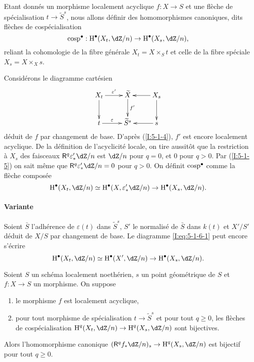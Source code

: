 \subsubsection{}\label{I:5-1-6}

Etant donnés un morphisme localement acyclique $f:X\to S$ et une flèche de 
spécialisation $t\to \widetilde S^s$, nous allons définir des 
homomorphismes canoniques, dits flèches de cospécialisation 
\[
  \cosp^\bullet : \h^\bullet(X_t,\dZ/n) \to \h^\bullet(X_s,\dZ/n)\text{,}
\]
reliant la cohomologie de la fibre générale $X_t=X\times_S t$ et celle de la 
fibre spéciale $X_s=X\times_X s$. 

Considérons le diagramme cartésien 
\[\xymatrix{
  X_t \ar[d] \ar[r]^-{\varepsilon'} 
    & \widetilde X \ar[d]^-{f'} 
    & \ar[l] X_s \ar[d] \\
  t \ar[r]^-\varepsilon 
    & \widetilde S^s 
    & \ar[l] s
}\]
déduit de $f$ par changement de base. D'après (\ref{I:5-1-4}), $f'$ est encore 
localement acyclique. De la définition de l'acyclicité locale, on tire 
aussitôt que la restriction à $X_s$ des faisceaux $\R^q \varepsilon_*' \dZ/n$ 
est $\dZ/n$ pour $q=0$, et $0$ pour $q>0$. Par (\ref{I:5-1-5}) on sait même que 
$\R^q \varepsilon_*'\dZ/n = 0$ pour $q>0$. On définit $\operatorname{cosp}^\bullet$ comme la 
flèche composée 
\begin{equation}\label{I:eq:5-1-6-1}
  \h^\bullet(X_t,\dZ/n) \simeq \h^\bullet(X,\varepsilon_*' \dZ/n) \to \h^\bullet(X_s,\dZ/n) \text{.}
\end{equation}

\paragraph{Variante}
Soient $\bar S$ l'adhérence de $\varepsilon(t)$ dans $\widetilde S^s$, $S'$ le 
normalisé de $\bar S$ dans $k(t)$ et $X'/S'$ déduit de $X/S$ par changement 
de base. Le diagramme \eqref{I:eq:5-1-6-1} peut encore s'écrire 
\[
  \h^\bullet(X_t,\dZ/n) \simeq \h^\bullet(X',\dZ/n) \to \h^\bullet(X_s,\dZ/n) \text{.}
\]





\begin{theorem}\label{I:5-1-7}
Soient $S$ un schéma localement noethérien, $s$ un point géométrique de 
$S$ et $f:X\to S$ un morphisme. On suppose 
\begin{enumerate}[\indent a)]
  \item le morphisme $f$ est localement acyclique, 
  \item pour tout morphisme de spécialisation $t\to \widetilde S^s$ et pour 
    tout $q\geqslant 0$, les flèches de cospécialisation 
    $\h^q(X_t,\dZ/n) \to \h^q(X_s,\dZ/n)$ sont bijectives.
\end{enumerate}

Alors l'homomorphisme canonique $(\R^q f_*\dZ/n)_s\to \h^q(X_s,\dZ/n)$ est 
bijectif pour tout $q\geqslant 0$. 
\end{theorem}

